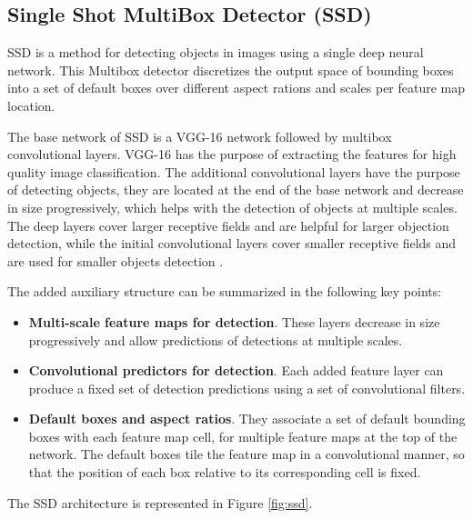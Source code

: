     \subsection{Single Shot MultiBox Detector (SSD)}

    
    \par SSD is a method for detecting objects in images using a single deep neural network. This Multibox detector discretizes the output space of bounding boxes into a set of default boxes over different aspect rations and scales per feature map location.

    \par The base network of SSD is a VGG-16 network \cite{simonyan2014deep} followed by multibox convolutional layers. VGG-16 has the purpose of extracting the features for high quality image classification. The additional convolutional layers have the purpose of detecting objects, they are located at the end of the base network and decrease in size progressively, which helps with the detection of objects at multiple scales. The deep layers cover larger receptive fields and are helpful for larger objection detection, while the initial convolutional layers cover smaller receptive fields and are used for smaller objects detection \cite{Liu2016}.
    \par The added auxiliary structure can be summarized in the following key points:

    \begin{itemize}
        \item \textbf{Multi-scale feature maps for detection}. These layers decrease in size progressively and allow predictions of detections at multiple scales.
        \item \textbf{Convolutional predictors for detection}. Each added feature layer can produce a fixed set of detection predictions using a set of convolutional 
        filters.
        \item \textbf{Default boxes and aspect ratios}. They associate a set of default bounding boxes with each feature map cell, for multiple feature maps at the top of the network. The default boxes tile the feature map in a convolutional manner, so that the position of each box relative to its corresponding cell is fixed.
    \end{itemize}

    
    \par The SSD architecture is represented in Figure \ref{fig:ssd}.

